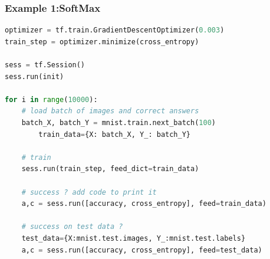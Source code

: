 \begin{frame}[fragile]
  \MyLogo
  \frametitle{Example 1:SoftMax}  
 
\scriptsize{
\begin{lstlisting}[language=python]
optimizer = tf.train.GradientDescentOptimizer(0.003)
train_step = optimizer.minimize(cross_entropy)

sess = tf.Session()
sess.run(init)

for i in range(10000):
	# load batch of images and correct answers
	batch_X, batch_Y = mnist.train.next_batch(100)
       	train_data={X: batch_X, Y_: batch_Y}

	# train
	sess.run(train_step, feed_dict=train_data)

	# success ? add code to print it
	a,c = sess.run([accuracy, cross_entropy], feed=train_data)

	# success on test data ?
	test_data={X:mnist.test.images, Y_:mnist.test.labels}
	a,c = sess.run([accuracy, cross_entropy], feed=test_data)
\end{lstlisting}
}


\end{frame}